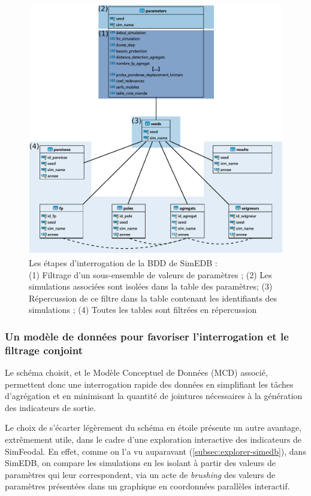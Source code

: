 \begin{figure}[H]
	\centering
	\captionsetup{width=\linewidth}
	\includegraphics[width=\linewidth]{img/MCD_SimEDB_simplified.pdf}
	\caption{Les étapes d'interrogation de la BDD de SimEDB :\\
		(1) Filtrage d'un sous-ensemble de valeurs de paramètres ;
		(2) Les simulations associées sont isolées dans la table des paramètres;
		(3) Répercussion de ce filtre dans la table contenant les identifiants des simulations ;
		(4) Toutes les tables sont filtrées en répercussion}
	\label{fig:MCD_SimEDB_etapes}
\end{figure}
\clearpage
		\subsubsection{Un modèle de données pour favoriser l'interrogation et le filtrage conjoint}

		Le schéma choisit, et le Modèle Conceptuel de Données (MCD) associé, permettent donc une interrogation rapide des données en simplifiant les tâches d'agrégation et en minimisant la quantité de jointures nécessaires à la génération des indicateurs de sortie.

		Le choix de s'écarter légèrement du schéma en étoile présente un autre avantage, extrêmement utile, dans le cadre d'une exploration interactive des indicateurs de SimFeodal.
		En effet, comme on l'a vu auparavant (\cref{subsec:explorer-simedb}), dans SimEDB, on compare les simulations en les isolant à partir des valeurs de paramètres qui leur correspondent, via un acte de \textit{brushing} des valeurs de paramètres présentées dans un graphique en coordonnées parallèles interactif.


